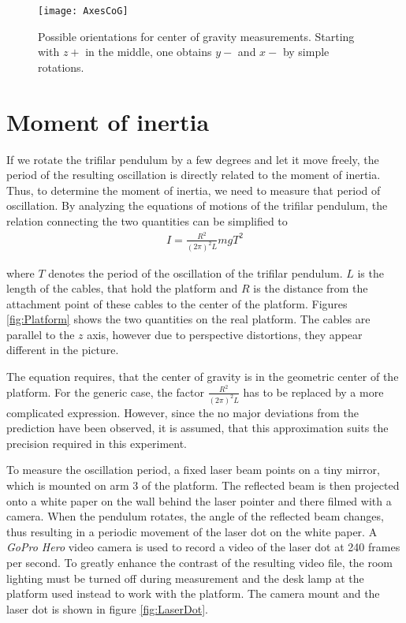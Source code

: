 \documentclass[journal]{IEEEtran}
\begin{document}
\begin{figure}
	\centering
	\texttt{[image: AxesCoG]}
	\caption{Possible orientations for center of gravity measurements. Starting with $z+$ in the middle, one obtains $y-$ and $x-$ by simple rotations.}
	\label{fig:AxesCoG}
\end{figure}

\section{Moment of inertia}

If we rotate the trifilar pendulum by a few degrees and let it move freely, the period of the resulting oscillation is directly related to the moment of inertia. Thus, to determine the moment of inertia, we need to measure that period of oscillation.
By analyzing the equations of motions of the trifilar pendulum, the relation connecting the two quantities can be simplified to \cite{report:ernest}
\begin{align}
	I = \frac{R^2}{(2\pi)^2 L} m g T^2
	\label{eq:I}
\end{align}

where $T$ denotes the period of the oscillation of the trifilar pendulum. $L$ is the length of the cables, that hold the platform and $R$ is the distance from the attachment point of these cables to the center of the platform. Figures \ref{fig:Platform} shows the two quantities on the real platform. The cables are parallel to the $z$ axis, however due to perspective distortions, they appear different in the picture.

The equation requires, that the center of gravity is in the geometric center of the platform.
For the generic case, the factor $\frac{R^2}{(2\pi)^2 L}$ has to be replaced by a more complicated expression.
However, since the no major deviations from the prediction have been observed, it is assumed, that this approximation suits the precision required in this experiment.

To measure the oscillation period, a fixed laser beam points on a tiny mirror, which is mounted on arm 3 of the platform.
The reflected beam is then projected onto a white paper on the wall behind the laser pointer and there filmed with a camera. 
When the pendulum rotates, the angle of the reflected beam changes, thus resulting in a periodic movement of the laser dot on the white paper.
A \emph{GoPro Hero} video camera is used to record a video of the laser dot at 240 frames per second.
To greatly enhance the contrast of the resulting video file, the room lighting must be turned off during measurement and the desk lamp at the platform used instead to work with the platform.
The camera mount and the laser dot is shown in figure \ref{fig:LaserDot}.
\end{document}
